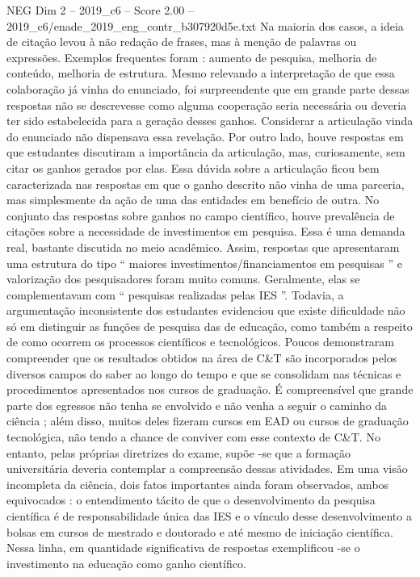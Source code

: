 \begin{textsample}{NEG Dim 2 – 2019\_c6 – Score 2.00 – 2019\_c6/enade\_2019\_eng\_contr\_b307920d5e.txt}
Na maioria dos casos, a ideia de citação levou à não redação de frases, mas à menção de palavras ou expressões.
Exemplos frequentes foram : aumento de pesquisa, melhoria de conteúdo, melhoria de estrutura.
Mesmo relevando a interpretação de que essa colaboração já vinha do enunciado, foi surpreendente que em grande parte dessas respostas não se descrevesse como alguma cooperação seria necessária ou deveria ter sido estabelecida para a geração desses ganhos.
Considerar a articulação vinda do enunciado não dispensava essa revelação.
Por outro lado, houve respostas em que estudantes discutiram a importância da articulação, mas, curiosamente, sem citar os ganhos gerados por elas.
Essa dúvida sobre a articulação ficou bem caracterizada nas respostas em que o ganho descrito não vinha de uma parceria, mas simplesmente da ação de uma das entidades em benefício de outra.
No conjunto das respostas sobre ganhos no campo científico, houve prevalência de citações sobre a necessidade de investimentos em pesquisa.
Essa é uma demanda real, bastante discutida no meio acadêmico.
Assim, respostas que apresentaram uma estrutura do tipo “ maiores investimentos/financiamentos em pesquisas ” e valorização dos pesquisadores foram muito comuns.
Geralmente, elas se complementavam com “ pesquisas realizadas pelas IES ”.
Todavia, a argumentação inconsistente dos estudantes evidenciou que existe dificuldade não só em distinguir as funções de pesquisa das de educação, como também a respeito de como ocorrem os processos científicos e tecnológicos.
Poucos demonstraram compreender que os resultados obtidos na área de C\&T são incorporados pelos diversos campos do saber ao longo do tempo e que se consolidam nas técnicas e procedimentos apresentados nos cursos de graduação.
É compreensível que grande parte dos egressos não tenha se envolvido e não venha a seguir o caminho da ciência ; além disso, muitos deles fizeram cursos em EAD ou cursos de graduação tecnológica, não tendo a chance de conviver com esse contexto de C\&T.
No entanto, pelas próprias diretrizes do exame, supõe -se que a formação universitária deveria contemplar a compreensão dessas atividades.
Em uma visão incompleta da ciência, dois fatos importantes ainda foram observados, ambos equivocados : o entendimento tácito de que o desenvolvimento da pesquisa científica é de responsabilidade única das IES e o vínculo desse desenvolvimento a bolsas em cursos de mestrado e doutorado e até mesmo de iniciação científica.
Nessa linha, em quantidade significativa de respostas exemplificou -se o investimento na educação como ganho científico.

\end{textsample}
